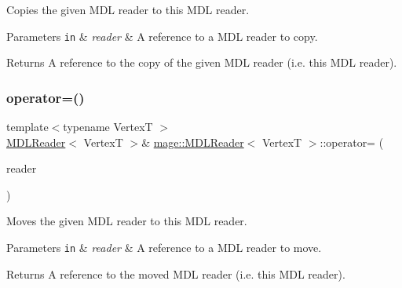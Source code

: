 Copies the given M\+DL reader to this M\+DL reader.


\begin{DoxyParams}[1]{Parameters}
\mbox{\tt in}  & {\em reader} & A reference to a M\+DL reader to copy. \\
\hline
\end{DoxyParams}
\begin{DoxyReturn}{Returns}
A reference to the copy of the given M\+DL reader (i.\+e. this M\+DL reader). 
\end{DoxyReturn}
\hypertarget{classmage_1_1_m_d_l_reader_a69770cb607b60596e6ebd96732e92938}{}\label{classmage_1_1_m_d_l_reader_a69770cb607b60596e6ebd96732e92938} 
\subsubsection{\texorpdfstring{operator=()}{operator=()}\hspace{0.1cm}{\footnotesize\ttfamily [2/2]}}
{\footnotesize\ttfamily template$<$typename VertexT $>$ \\
\hyperlink{classmage_1_1_m_d_l_reader}{M\+D\+L\+Reader}$<$ VertexT $>$\& \hyperlink{classmage_1_1_m_d_l_reader}{mage\+::\+M\+D\+L\+Reader}$<$ VertexT $>$\+::operator= (\begin{DoxyParamCaption}\item[{\hyperlink{classmage_1_1_m_d_l_reader}{M\+D\+L\+Reader}$<$ VertexT $>$ \&\&}]{reader }\end{DoxyParamCaption})\hspace{0.3cm}{\ttfamily [delete]}}

Moves the given M\+DL reader to this M\+DL reader.


\begin{DoxyParams}[1]{Parameters}
\mbox{\tt in}  & {\em reader} & A reference to a M\+DL reader to move. \\
\hline
\end{DoxyParams}
\begin{DoxyReturn}{Returns}
A reference to the moved M\+DL reader (i.\+e. this M\+DL reader). 
\end{DoxyReturn}
\hypertarget{classmage_1_1_m_d_l_reader_a8b99fb3bdea5e9dae156b135c160c22d}{}\label{classmage_1_1_m_d_l_reader_a8b99fb3bdea5e9dae156b135c160c22d} 
